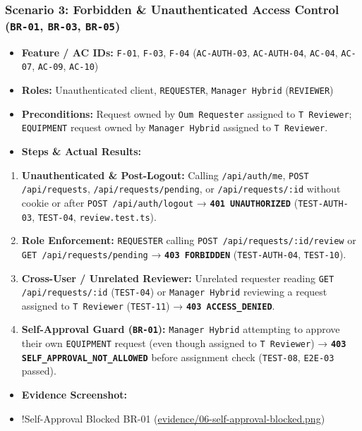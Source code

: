 \documentclass[11pt,a4paper]{article}
\begin{document}
\subsubsection{Scenario 3: Forbidden \& Unauthenticated Access Control (\texttt{BR-01}, \texttt{BR-03}, \texttt{BR-05})}
\begin{itemize}[leftmargin=*,itemsep=2pt,topsep=2pt]
  \item \textbf{Feature / AC IDs:} \texttt{F-01}, \texttt{F-03}, \texttt{F-04} (\texttt{AC-AUTH-03}, \texttt{AC-AUTH-04}, \texttt{AC-04}, \texttt{AC-07}, \texttt{AC-09}, \texttt{AC-10})
  \item \textbf{Roles:} Unauthenticated client, \texttt{REQUESTER}, \texttt{Manager Hybrid} (\texttt{REVIEWER})
  \item \textbf{Preconditions:} Request owned by \texttt{Oum Requester} assigned to \texttt{T Reviewer}; \texttt{EQUIPMENT} request owned by \texttt{Manager Hybrid} assigned to \texttt{T Reviewer}.
  \item \textbf{Steps \& Actual Results:}
\end{itemize}
\begin{enumerate}[leftmargin=*,itemsep=2pt,topsep=2pt]
  \item \textbf{Unauthenticated \& Post-Logout:} Calling \texttt{/api/auth/me}, \texttt{POST /api/requests}, \texttt{/api/requests/pending}, or \texttt{/api/requests/:id} without cookie or after \texttt{POST /api/auth/logout} → \textbf{\texttt{401 UNAUTHORIZED}} (\texttt{TEST-AUTH-03}, \texttt{TEST-04}, \texttt{review.test.ts}).
  \item \textbf{Role Enforcement:} \texttt{REQUESTER} calling \texttt{POST /api/requests/:id/review} or \texttt{GET /api/requests/pending} → \textbf{\texttt{403 FORBIDDEN}} (\texttt{TEST-AUTH-04}, \texttt{TEST-10}).
  \item \textbf{Cross-User / Unrelated Reviewer:} Unrelated requester reading \texttt{GET /api/requests/:id} (\texttt{TEST-04}) or \texttt{Manager Hybrid} reviewing a request assigned to \texttt{T Reviewer} (\texttt{TEST-11}) → \textbf{\texttt{403 ACCESS\_DENIED}}.
  \item \textbf{Self-Approval Guard (\texttt{BR-01}):} \texttt{Manager Hybrid} attempting to approve their own \texttt{EQUIPMENT} request (even though assigned to \texttt{T Reviewer}) → \textbf{\texttt{403 SELF\_APPROVAL\_NOT\_ALLOWED}} before assignment check (\texttt{TEST-08}, \texttt{E2E-03} passed).
\end{enumerate}
\begin{itemize}[leftmargin=*,itemsep=2pt,topsep=2pt]
  \item \textbf{Evidence Screenshot:}
  \item !Self-Approval Blocked BR-01 (\url{evidence/06-self-approval-blocked.png})
\end{itemize}
\end{document}
